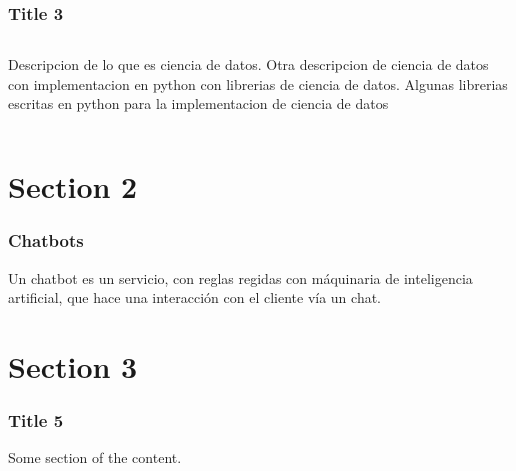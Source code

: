 \documentclass{beamer}
\begin{document}
    \begin{frame}
        \frametitle{Title 3}
        \begin{columns}
            Descripcion de lo que es ciencia de datos.
            Otra descripcion de ciencia de datos
            con implementacion en python con librerias de ciencia de datos.
            Algunas librerias escritas en python para la implementacion de ciencia de datos
        \end{columns}
    \end{frame}

    \section{Section 2}

    \begin{frame}
        \frametitle{Chatbots}
        Un chatbot es un servicio, con reglas regidas con máquinaria de inteligencia artificial,
        que hace una interacción con el cliente vía un chat.
    \end{frame}

    \section{Section 3}
     \begin{frame}
         \frametitle{Title 5}
         Some section of the content.
     \end{frame}
\end{document}
